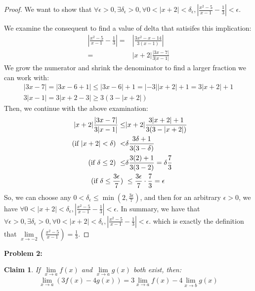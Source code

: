 \documentclass{article}
\newcommand{\eps}{\ensuremath{\epsilon}}
\newcommand{\limx}[2]{\ensuremath{\underset{x\to #2 }{\lim} #1 (x)}}
\newtheorem{clm}{Claim}
\begin{document}
\begin{proof}
	We want to show that
	$\forall \eps > 0, \exists \delta_\eps > 0,
	\forall 0 < |x + 2| < \delta_\eps, |\frac{x^2-5}{x-1} - \frac{1}{3}| < \eps$.

	We examine the consequent to find a value of delta
	that satisifes this implication:
	\begin{align}
		|\frac{x^2-5}{x-1} - \frac{1}{3}| = & | \frac{3x^2 - x - 14}{3(x-1)}| \\
		= & |x+2| \frac{|3x-7|}{3|x - 1|}
	\end{align}
	We grow the numerator and shrink the denominator to find a larger fraction we can work with:
	\begin{align}
		|3x-7| = |3x -6 + 1| \le |3x - 6| + 1 = |-3||x + 2| + 1 = 3|x + 2| + 1 \\
		3|x - 1| = 3|x + 2 - 3| \geq 3(3 - |x + 2|)
	\end{align}
	Then, we continue with the above examination:
	\begin{align}
		|x+2| \frac{|3x-7|}{3|x - 1|} \le & |x + 2| \frac{3|x+2| + 1}{3(3 - |x + 2|)} \\
		\textrm{ (if $ |x + 2| < \delta$) } < & \delta\frac{3\delta+1}{3(3 - \delta)} \\
		\textrm{ (if $\delta \le 2$) } \le & \delta\frac{3(2)+1}{3(3 - 2)} = \delta\frac{7}{3} \\
		\textrm{ (if $\delta \le \frac{3 \eps}{7}$) } & \le \frac{3\eps}{7} \cdot \frac{7}{3} = \eps
	\end{align}
	So, we can choose any $0 < \delta_\eps \le \min(2, \frac{3\eps}{7})$,
	and then for an arbitrary $\eps > 0$,
	we have 
	$\forall 0 < |x + 2| < \delta_\eps, |\frac{x^2-5}{x-1} - \frac{1}{3}| < \eps$.
	In summary,
	we have that
	$\forall \eps > 0,
	\exists \delta_\eps > 0,
	\forall 0 < |x + 2| < \delta_\eps, |\frac{x^2-5}{x-1} - \frac{1}{3}| < \eps$.
	which is exactly the definition that 
	$\underset{x\to -2}{\lim} (\frac{x^2 - 5}{x - 1}) = \frac{1}{3}$.
\end{proof}

\textbf{Problem 2:}

\begin{clm}
	If $\limx{f}{a}$ and $\limx{g}{a}$ both exist, then:
	\begin{align}
		\underset{x \to a}{\lim} (3f(x) - 4g(x))  = 3\limx{f}{a} - 4\limx{g}{b}
	\end{align}
\end{clm}
\end{document}
